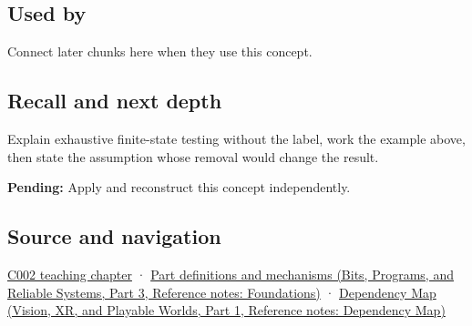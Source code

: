 \subsection{Used by}\label{appendix-05db24ccc28a-used-by}

\hypertarget{appendix-05db24ccc28a-used-by}{}

Connect later chunks here when they use this concept.

\subsection{Recall and next depth}\label{appendix-05db24ccc28a-recall-and-next-depth}

\hypertarget{appendix-05db24ccc28a-recall-and-next-depth}{}

Explain exhaustive finite-state testing without the label, work the example above, then state the assumption whose removal would change the result.

\textbf{Pending:} Apply and reconstruct this concept independently.

\subsection{Source and navigation}\label{appendix-05db24ccc28a-source-and-navigation}

\hypertarget{appendix-05db24ccc28a-source-and-navigation}{}

\hyperref[01-foundations-i-ch001-arithmetic-becomes-a-policy]{C002 teaching chapter} · \href{../01-Bits-Programs-and-Reliable-Systems-P03/main.pdf\#nameddest=appendix-fd090d982a15}{Part definitions and mechanisms (Bits, Programs, and Reliable Systems, Part 3, Reference notes: Foundations)} · \href{../07-Vision-XR-and-Playable-Worlds-P01/main.pdf\#nameddest=appendix-4ad47bdd269a}{Dependency Map (Vision, XR, and Playable Worlds, Part 1, Reference notes: Dependency Map)}
